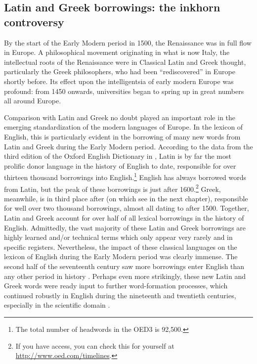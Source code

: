 \subsection{Latin and Greek borrowings: the inkhorn controversy}

By the start of the Early Modern period in 1500, the Renaissance was in full flow in Europe. A philosophical movement originating in what is now Italy, the intellectual roots of the Renaissance were in Classical Latin and Greek thought, particularly the Greek philosophers, who had been ``rediscovered'' in Europe shortly before. Its effect upon the intelligentsia of early modern Europe was profound: from 1450 onwards, universities began to spring up in great numbers all around Europe.

Comparison with Latin and Greek no doubt played an important role in the emerging standardization of the modern languages of Europe. In the lexicon of English, this is particularly evident in the borrowing of many new words from Latin and Greek during the Early Modern period. According to the data from the third edition of the Oxford English Dictionary in \citet[23--28]{Durkin2014}, Latin is by far the most prolific donor language in the history of English to date, responsible for over thirteen thousand borrowings into English.\footnote{The total number of headwords in the OED3 is 92,500.} English has always borrowed words from Latin, but the peak of these borrowings is just after 1600.\footnote{If you have access, you can check this for yourself at \url{http://www.oed.com/timelines}.} Greek, meanwhile, is in third place after  (on which see  in the next chapter), responsible for well over two thousand borrowings, almost all dating to after 1500. Together, Latin and Greek account for over half of all lexical borrowings in the history of English. Admittedly, the vast majority of these Latin and Greek borrowings are highly learned and/or technical terms which only appear very rarely and in specific registers. Nevertheless, the impact of these classical languages on the lexicon of English during the Early Modern period was clearly immense. The second half of the seventeenth century saw more borrowings enter English than any other period in history \citep[299--301]{Durkin2014}. Perhaps even more strikingly, these new Latin and Greek words were ready input to further word-formation processes, which continued robustly in English during the nineteenth and twentieth centuries, especially in the scientific domain \citep[340--347]{Durkin2014}.

